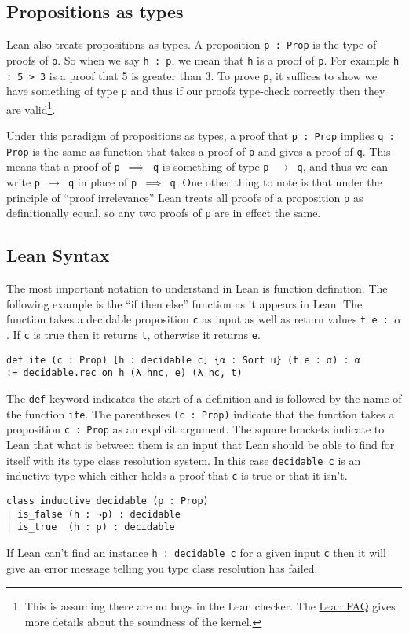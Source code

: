 \documentclass{article}
\renewcommand{\a}{\alpha}
\newcommand{\ct}{\texttt}
\begin{document}
\subsection{Propositions as types}
Lean also treats propositions as types. 
A proposition \ct{p : Prop} is the type of proofs of \ct{p}.
So when we say \ct{h : p}, we mean that \ct{h} is a proof of \ct{p}.
For example \ct{h : 5 > 3} is a proof that 5 is greater than 3.
To prove \ct{p}, it suffices to show we have something of type \ct{p} and thus if our proofs type-check correctly then they are valid\footnote{This is assuming there are no bugs in the Lean checker. The \href{https://github.com/leodemoura/lean/blob/master/doc/faq.md}{Lean FAQ} gives more details about the soundness of the kernel.}.

Under this paradigm of propositions as types, a proof that \ct{p : Prop} implies \ct{q : Prop} is the same as function that takes a proof of \ct{p} and gives a proof of \ct{q}.
This means that a proof of \ct{p $\implies$ q} is something of type \ct{p $\to$ q}, and thus we can write \ct{p $\to$ q} in place of \ct{p $\implies$ q}.
One other thing to note is that under the principle of ``proof irrelevance'' Lean treats all proofs of a proposition \ct{p} as definitionally equal, so any two proofs of \ct{p} are in effect the same.

\subsection{Lean Syntax} 

The most important notation to understand in Lean is function definition.
The following example is the ``if then else'' function as it appears in Lean.
The function takes a decidable proposition \ct{c} as input as well as return values \ct{t e : $\a$}.
If \ct{c} is true then it returns \ct{t}, otherwise it returns \ct{e}.
\begin{lstlisting}
def ite (c : Prop) [h : decidable c] {α : Sort u} (t e : α) : α 
:= decidable.rec_on h (λ hnc, e) (λ hc, t)
\end{lstlisting}
The \ct{def} keyword indicates the start of a definition and is followed by the name of the function \ct{ite}.
The parentheses \ct{(c : Prop)} indicate that the function takes a proposition \ct{c : Prop} as an explicit argument.
The square brackets indicate to Lean that what is between them is an input that Lean should be able to find for itself with its type class resolution system.
In this case \ct{decidable c} is an inductive type which either holds a proof that \ct{c} is true or that it isn't.
\begin{lstlisting}
class inductive decidable (p : Prop)
| is_false (h : ¬p) : decidable
| is_true  (h : p) : decidable

\end{lstlisting}
If Lean can't find an instance \ct{h : decidable c} for a given input \ct{c} then it will give an error message telling you type class resolution has failed.
\end{document}
